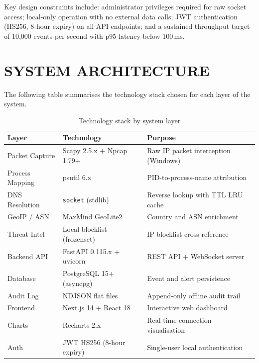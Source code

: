 \documentclass[12pt]{article}
\begin{document}
\noindent Key design constraints include: administrator privileges required for
raw socket access; local-only operation with no external data calls; JWT
authentication (HS256, 8-hour expiry) on all API endpoints; and a sustained
throughput target of 10,000 events per second with p95 latency below 100\,ms.

\newpage
\section*{SYSTEM ARCHITECTURE}

The following table summarises the technology stack chosen for each layer of
the system.

\begin{table}[H]
\centering
\small
\begin{tabular}{lll}
\toprule
\textbf{Layer} & \textbf{Technology} & \textbf{Purpose} \\
\midrule
Packet Capture   & Scapy 2.5.x + Npcap 1.79+      & Raw IP packet interception (Windows) \\
Process Mapping  & psutil 6.x                      & PID-to-process-name attribution \\
DNS Resolution   & \texttt{socket} (stdlib)        & Reverse lookup with TTL LRU cache \\
GeoIP / ASN      & MaxMind GeoLite2                & Country and ASN enrichment \\
Threat Intel     & Local blocklist (frozenset)     & IP blocklist cross-reference \\
Backend API      & FastAPI 0.115.x + uvicorn       & REST API + WebSocket server \\
Database         & PostgreSQL 15+ (asyncpg)        & Event and alert persistence \\
Audit Log        & NDJSON flat files               & Append-only offline audit trail \\
Frontend         & Next.js 14 + React 18           & Interactive web dashboard \\
Charts           & Recharts 2.x                    & Real-time connection visualisation \\
Auth             & JWT HS256 (8-hour expiry)       & Single-user local authentication \\
\bottomrule
\end{tabular}
\caption{Technology stack by system layer}
\end{table}
\end{document}
